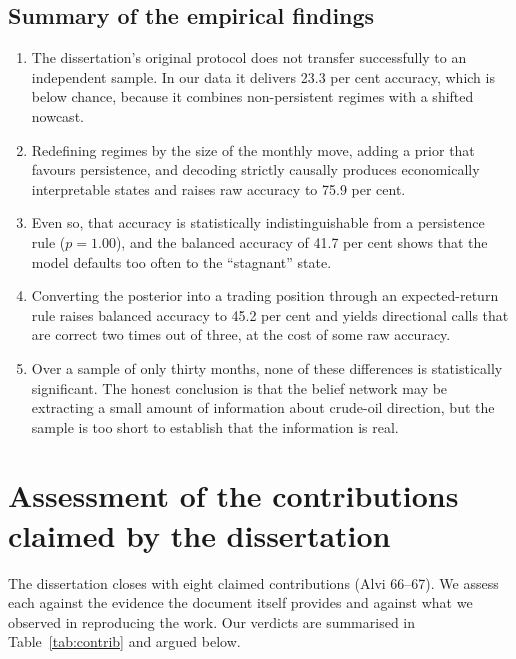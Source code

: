 \documentclass[11pt,a4paper]{article}
\begin{document}
\subsection{Summary of the empirical findings}

\begin{enumerate}
\item The dissertation's original protocol does not transfer successfully to an independent
sample. In our data it delivers 23.3 per cent accuracy, which is below chance, because it combines
non-persistent regimes with a shifted nowcast.
\item Redefining regimes by the size of the monthly move, adding a prior that favours
persistence, and decoding strictly causally produces economically interpretable states and raises
raw accuracy to 75.9 per cent.
\item Even so, that accuracy is statistically indistinguishable from a persistence rule
($p = 1.00$), and the balanced accuracy of 41.7 per cent shows that the model defaults too often
to the ``stagnant'' state.
\item Converting the posterior into a trading position through an expected-return rule raises
balanced accuracy to 45.2 per cent and yields directional calls that are correct two times out of
three, at the cost of some raw accuracy.
\item Over a sample of only thirty months, none of these differences is statistically significant.
The honest conclusion is that the belief network may be extracting a small amount of information
about crude-oil direction, but the sample is too short to establish that the information is real.
\end{enumerate}

\section{Assessment of the contributions claimed by the dissertation}

The dissertation closes with eight claimed contributions (Alvi 66--67). We assess each against the
evidence the document itself provides and against what we observed in reproducing the work. Our
verdicts are summarised in Table~\ref{tab:contrib} and argued below.
\end{document}
